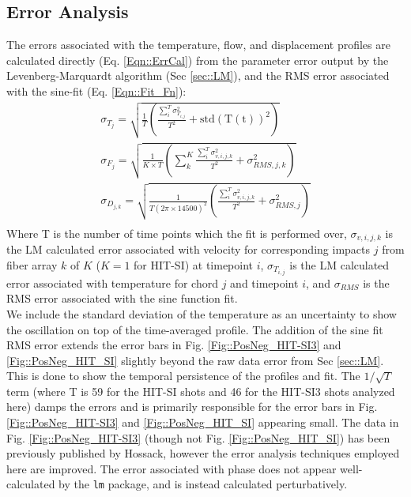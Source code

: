 	\subsection{Error Analysis}\label{sec:ErrorAnal}
	\hspace*{4ex}The errors associated with the temperature, flow, and displacement profiles are calculated directly (Eq. \ref{Eqn::ErrCal}) from the parameter error output by the Levenberg-Marquardt algorithm (Sec \ref{sec::LM}), and the RMS error associated with the sine-fit (Eq. \ref{Eqn::Fit_Fn}):
	\begin{equation}\label{Eqn::ErrCal}
	\begin{split}
	\sigma_{T_j} = \sqrt{\frac{1}{T}\left(\frac{\sum_i^T\sigma_{T_{i,j}}^2}{T^2} + \mathrm{std(T(t))^2}\right)}\\
	\sigma_{F_j}=\sqrt{\frac{1}{K\times{T}}\left(\sum_k^K\frac{\sum_i^T\sigma_{v,i,j,k}^2 }{T^2}+\sigma_{RMS,j,k}^2\right)}\\
	\sigma_{D_{j,k}}=\sqrt{\frac{1}{T{\left(2\pi\times14500\right)^2}}\left(\frac{\sum_i^T\sigma_{v,i,j,k}^2}{T^2}+\sigma_{RMS,j}^2\right)}\\
	\end{split}
	\end{equation}
	Where T is the number of time points which the fit is performed over, $\sigma_{v,i,j,k}$ is the LM calculated error associated with velocity for corresponding impacts $j$ from fiber array $k$ of $K$ ($K=1$ for HIT-SI) at timepoint $i$, $\sigma_{T_{i,j}}$ is the LM calculated error associated with temperature for chord $j$ and timepoint $i$, and $\sigma_{RMS}$ is the RMS error associated with the sine function fit.\\
	\hspace*{4ex}We include the standard deviation of the temperature as an uncertainty to show the oscillation on top of the time-averaged profile. The addition of the sine fit RMS error extends the error bars in Fig. \ref{Fig::PosNeg_HIT-SI3} and \ref{Fig::PosNeg_HIT_SI} slightly beyond the raw data error from Sec \ref{sec::LM}. This is done to show the temporal persistence of the profiles and fit. The $1/\sqrt{T}$ term (where T is 59 for the HIT-SI shots and 46 for the HIT-SI3 shots analyzed here) damps the errors and is primarily responsible for the error bars in Fig. \ref{Fig::PosNeg_HIT-SI3} and \ref{Fig::PosNeg_HIT_SI} appearing small. The data in Fig. \ref{Fig::PosNeg_HIT-SI3} (though not Fig. \ref{Fig::PosNeg_HIT_SI}) has been previously published by Hossack\cite{Hossack_HitSi3}, however the error analysis techniques employed here are improved. The error associated with phase does not appear well-calculated by the \texttt{lm} package, and is instead calculated perturbatively. \\
